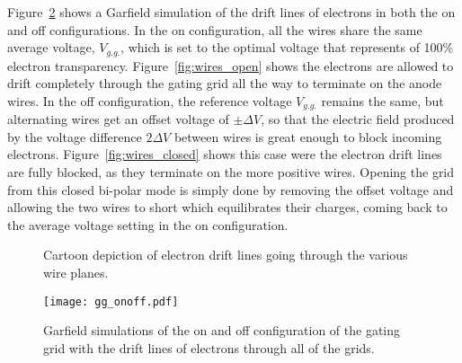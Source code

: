 Figure~\ref{fig:gg_onoff} shows a Garfield simulation of the drift lines of electrons in both the on and off configurations. In the on configuration, all the wires share the same average voltage, $V_{g.g.}$, which is set to the optimal voltage that represents of 100\% electron transparency. Figure~\ref{fig:wires_open} shows the electrons are allowed to drift completely through the gating grid all the way to terminate on the anode wires. In the off configuration, the reference voltage $V_{g.g.}$ remains the same, but alternating wires get an offset voltage of $\pm \Delta V$, so that the electric field produced by the voltage difference $2\Delta V$ between wires is great enough to block incoming electrons. Figure~\ref{fig:wires_closed} shows this case were the electron drift lines are fully blocked, as they terminate on the more positive wires. Opening the grid from this closed bi-polar mode is simply done by removing the offset voltage and allowing the two wires to short which equilibrates their charges, coming back to the average voltage setting in the on configuration.

\begin{figure}[!htb]%
    \centering
    \qquad
    \caption{Cartoon depiction of electron drift lines going through the various wire planes.}%
    \label{fig:wires}%
\end{figure}

\begin{figure}[!htb]
\centering
\texttt{[image: gg\_onoff.pdf]}
\caption{Garfield simulations of the on and off configuration of the gating grid with the drift lines of electrons through all of the grids.}
\label{fig:gg_onoff}
\end{figure}


